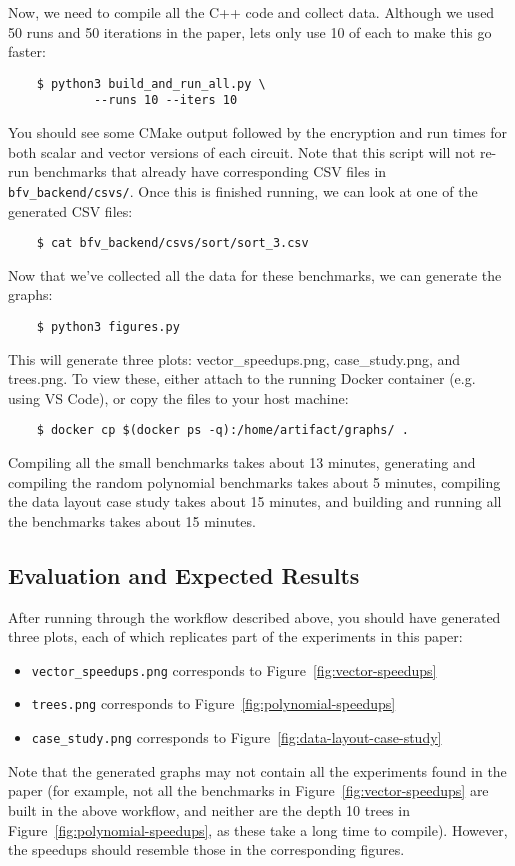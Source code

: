 Now, we need to compile all the C++ code and collect data. Although we used 50 runs and 50 iterations in the paper, lets only use 10 of each to make this go faster:
\begin{verbatim}
    $ python3 build_and_run_all.py \
            --runs 10 --iters 10    
\end{verbatim}
You should see some CMake output followed by the encryption and run times for both scalar and vector versions of each circuit. Note that this script will not re-run benchmarks that already have corresponding CSV files in {\tt bfv\_backend/csvs/}.
Once this is finished running, we can look at one of the generated CSV files:
\begin{verbatim}
    $ cat bfv_backend/csvs/sort/sort_3.csv    
\end{verbatim}
Now that we've collected all the data for these benchmarks, we can generate the graphs:
\begin{verbatim}
    $ python3 figures.py
\end{verbatim}
This will generate three plots: vector\_speedups.png, case\_study.png, and trees.png. To view these, either attach to the running Docker container (e.g. using VS Code), or copy the files to your host machine:
\begin{verbatim}
    $ docker cp $(docker ps -q):/home/artifact/graphs/ .    
\end{verbatim}

Compiling all the small benchmarks takes about 13 minutes, generating and compiling the random polynomial benchmarks takes about 5 minutes, compiling the data layout case study takes about 15 minutes, and building and running all the benchmarks takes about 15 minutes.


\subsection{Evaluation and Expected Results}

After running through the workflow described above, you should have generated three plots, each of which replicates part of the experiments in this paper:
\begin{itemize}
    \item {\tt vector\_speedups.png} corresponds to Figure~\ref{fig:vector-speedups}
    \item {\tt trees.png} corresponds to Figure~\ref{fig:polynomial-speedups}
    \item {\tt case\_study.png} corresponds to Figure~\ref{fig:data-layout-case-study}
\end{itemize}
Note that the generated graphs may not contain all the experiments found in the paper (for example, not all the benchmarks in Figure~\ref{fig:vector-speedups} are built in the above workflow, and neither are the depth 10 trees in Figure~\ref{fig:polynomial-speedups}, as these take a long time to compile).
However, the speedups should resemble those in the corresponding figures.

